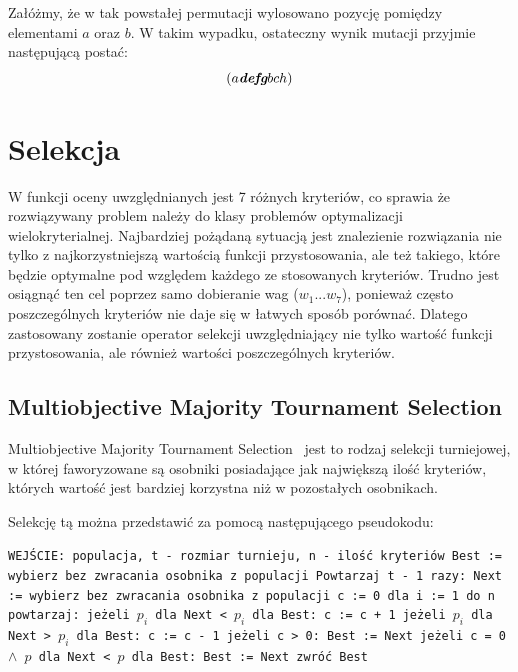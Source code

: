 \documentclass[brudnopis]{xmgr}
\begin{document}
Załóżmy, że w tak powstałej permutacji wylosowano pozycję pomiędzy elementami $a$ oraz $b$. W takim wypadku, ostateczny wynik mutacji przyjmie następującą postać:
$$ (a \textit{\textbf{defg}} b c h) $$


\section{Selekcja}

W funkcji oceny uwzględnianych jest 7 różnych kryteriów, co sprawia że rozwiązywany problem należy do klasy problemów optymalizacji wielokryterialnej. Najbardziej pożądaną sytuacją jest znalezienie rozwiązania nie tylko z najkorzystniejszą wartością funkcji przystosowania, ale też takiego, które będzie optymalne pod względem każdego ze stosowanych kryteriów. Trudno jest osiągnąć ten cel poprzez samo dobieranie wag ($w_1 ... w_7$), ponieważ często poszczególnych kryteriów nie daje się w łatwych sposób porównać. Dlatego zastosowany zostanie operator selekcji uwzględniający nie tylko wartość funkcji przystosowania, ale również wartości poszczególnych kryteriów.

\subsection{Multiobjective Majority Tournament Selection}

Multiobjective Majority Tournament Selection~\cite{Luke2009Metaheuristics} jest to rodzaj selekcji turniejowej, w której faworyzowane są osobniki posiadające jak największą ilość kryteriów, których wartość jest bardziej korzystna niż w pozostałych osobnikach.

Selekcję tą można przedstawić za pomocą następującego pseudokodu:\newline

\noindent
\texttt{WEJŚCIE: populacja, t - rozmiar turnieju, n - ilość kryteriów\newline
Best := wybierz bez zwracania osobnika z populacji\newline
Powtarzaj t - 1 razy:\newline
\indent Next := wybierz bez zwracania osobnika z populacji\newline
\indent c := 0\newline
\indent dla i := 1 do n powtarzaj:\newline
\indent\indent jeżeli $p_i$ dla Next < $p_i$ dla Best:\newline
\indent\indent\indent c := c + 1\newline
\indent\indent jeżeli $p_i$ dla Next > $p_i$ dla Best:\newline
\indent\indent\indent c := c - 1\newline
\indent jeżeli c > 0:\newline
\indent\indent Best := Next\newline
\indent jeżeli c = 0 $\wedge$ $p$ dla Next < $p$ dla Best:\newline
\indent\indent Best := Next\newline
zwróć Best\newline
}
\end{document}
